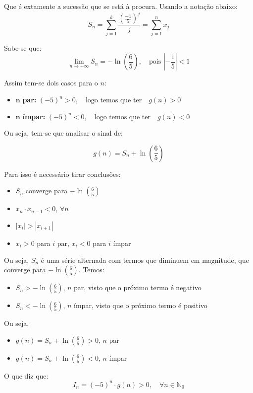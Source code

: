 \documentclass[12pt,a4paper]{article}
\begin{document}
Que é extamente a sucessão que se está à procura. Usando a notação abaixo:
\[
S_n = \sum_{j=1}^{k} \frac{\left( \frac{-1}{5} \right)^j}{j} = \sum_{j=1}^{n} x_j
\]

Sabe-se que:
\[
\lim_{n \to +\infty} S_n = -\ln\left(\frac{6}{5}\right), \quad \text{pois } \left| -\frac{1}{5} \right| < 1
\]

Assim tem-se dois casos para o \( n \):
\begin{itemize}
    \item  \( \textbf{n} \) \textbf{par:} \((-5)^n > 0, \quad \text{logo temos que ter} \quad g(n) > 0\)

    \item  \( \textbf{n} \) \textbf{ímpar:} \((-5)^n < 0, \quad \text{logo temos que ter} \quad g(n) < 0\)
\end{itemize}

Ou seja, tem-se que analisar o sinal de:

\[
g(n) = S_n + \ln\left(\frac{6}{5}\right)
\]

Para isso é necessário tirar conclusões:

\begin{itemize}
    \item \( S_n \) converge para \(- \ln\left(\frac{6}{5}\right) \)
    \item \( x_n \cdot x_{n-1} < 0 \), \(\forall n\)
    \item \( |x_i| > |x_{i+1}| \)
    \item \( x_i > 0 \) para \( i \) par, \( x_i < 0 \) para \( i \) ímpar
\end{itemize}
Ou seja, \( S_n \) é uma série alternada com termos que diminuem em magnitude, que converge para \( -\ln\left(\frac{6}{5}\right) \).
Temos:
\begin{itemize}
    \item \( S_n > - \ln\left(\frac{6}{5}\right) \), \( n \) par, visto que o próximo termo é negativo
    \item \( S_n < - \ln\left(\frac{6}{5}\right) \), \( n \) ímpar, visto que o próximo termo é positivo
\end{itemize}
Ou seja,
\begin{itemize}
    \item \( g(n) = S_n + \ln\left(\frac{6}{5}\right) > 0 \), \( n \) par
    \item \( g(n) = S_n + \ln\left(\frac{6}{5}\right) < 0 \), \( n \) ímpar
\end{itemize}
O que diz que:
 \[
I_n = (-5)^n \cdot g(n) > 0, \quad \forall n \in \mathbb{N}_0
\]
\end{document}

